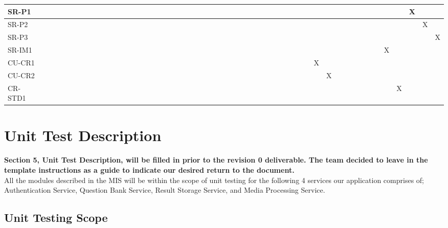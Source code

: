 \documentclass[12pt, titlepage]{article}
\begin{document}
\begin{landscape}
\begin{table}[!ht]
{\begin{tabular}{|l|l|l|l|l|l|l|l|l|l|l|l|l|l|l|l|l|l|l|l|l|l|l|l|l|l|l|l|l|l|l|l|l|l|l|l|}
      SR-P1 & ~ & ~ & ~ & ~ & ~ & ~ & ~ & ~ & ~ & ~ & ~ & ~ & ~ & ~ & ~ & ~ & ~ & ~ & ~ & ~ & ~ & ~ & ~ & ~ & ~ & ~ & ~ & ~ & ~ & ~ & ~ & ~ & X & ~ & ~ \\ \hline
      SR-P2 & ~ & ~ & ~ & ~ & ~ & ~ & ~ & ~ & ~ & ~ & ~ & ~ & ~ & ~ & ~ & ~ & ~ & ~ & ~ & ~ & ~ & ~ & ~ & ~ & ~ & ~ & ~ & ~ & ~ & ~ & ~ & ~ & ~ & X & ~ \\ \hline
      SR-P3 & ~ & ~ & ~ & ~ & ~ & ~ & ~ & ~ & ~ & ~ & ~ & ~ & ~ & ~ & ~ & ~ & ~ & ~ & ~ & ~ & ~ & ~ & ~ & ~ & ~ & ~ & ~ & ~ & ~ & ~ & ~ & ~ & ~ & ~ & X \\ \hline
      SR-IM1 & ~ & ~ & ~ & ~ & ~ & ~ & ~ & ~ & ~ & ~ & ~ & ~ & ~ & ~ & ~ & ~ & ~ & ~ & ~ & ~ & ~ & ~ & ~ & ~ & ~ & ~ & ~ & ~ & ~ & ~ & X & ~ & ~ & ~ & ~ \\ \hline
      CU-CR1 & ~ & ~ & ~ & ~ & ~ & ~ & ~ & ~ & ~ & ~ & ~ & ~ & ~ & ~ & ~ & ~ & ~ & ~ & ~ & ~ & ~ & ~ & ~ & ~ & X & ~ & ~ & ~ & ~ & ~ & ~ & ~ & ~ & ~ & ~ \\ \hline
      CU-CR2 & ~ & ~ & ~ & ~ & ~ & ~ & ~ & ~ & ~ & ~ & ~ & ~ & ~ & ~ & ~ & ~ & ~ & ~ & ~ & ~ & ~ & ~ & ~ & ~ & ~ & X & ~ & ~ & ~ & ~ & ~ & ~ & ~ & ~ & ~ \\ \hline
      CR-STD1 & ~ & ~ & ~ & ~ & ~ & ~ & ~ & ~ & ~ & ~ & ~ & ~ & ~ & ~ & ~ & ~ & ~ & ~ & ~ & ~ & ~ & ~ & ~ & ~ & ~ & ~ & ~ & ~ & ~ & ~ & ~ & X & ~ & ~ & ~ \\ \hline
  \end{tabular}
  }
\end{table}
\end{landscape}

\newpage
\section{Unit Test Description}
\hspace{2em}\textbf{Section 5, Unit Test Description, will be filled in prior to the revision 0 deliverable. The team decided to leave in the template instructions as a guide to indicate our desired return to the document.}\\

All the modules described in the MIS will be within the scope of unit testing for the following 4 services our application comprises of; Authentication Service, Question Bank Service, Result Storage Service, and Media Processing Service. 

\subsection{Unit Testing Scope}
\end{document}
